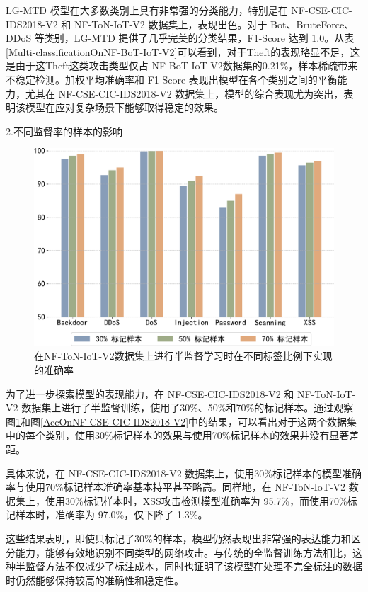 \documentclass[promaster]{thesis-uestc}
\begin{document}
LG-MTD 模型在大多数类别上具有非常强的分类能力，特别是在 NF-CSE-CIC-IDS2018-V2 和 NF-ToN-IoT-V2 数据集上，表现出色。对于 Bot、BruteForce、DDoS 等类别，LG-MTD 提供了几乎完美的分类结果，F1-Score 达到 1.0。从表\ref{Multi-classificationOnNF-BoT-IoT-V2}可以看到，对于Theft的表现略显不足，这是由于这Theft这类攻击类型仅占 NF-BoT-IoT-V2数据集的0.21\%，样本稀疏带来不稳定检测。加权平均准确率和 F1-Score 表现出模型在各个类别之间的平衡能力，尤其在 NF-CSE-CIC-IDS2018-V2 数据集上，模型的综合表现尤为突出，表明该模型在应对复杂场景下能够取得稳定的效果。










2.不同监督率的样本的影响

\begin{figure}[h!]
    \centering
    \includegraphics[width=1\linewidth]{./pic/chart3.pdf}
    \caption{在NF-ToN-IoT-V2数据集上进行半监督学习时在不同标签比例下实现的准确率}
    \label{AccOnNF-ToN-IoT-V2}
\end{figure}
为了进一步探索模型的表现能力，在 NF-CSE-CIC-IDS2018-V2 和 NF-ToN-IoT-V2 数据集上进行了半监督训练，使用了30\%、50\%和70\%的标记样本。通过观察图\ref{AccOnNF-ToN-IoT-V2}和图\ref{AccOnNF-CSE-CIC-IDS2018-V2}中的结果，可以看出对于这两个数据集中的每个类别，使用30\%标记样本的效果与使用70\%标记样本的效果并没有显著差距。

具体来说，在 NF-CSE-CIC-IDS2018-V2 数据集上，使用30\%标记样本的模型准确率与使用70\%标记样本准确率基本持平甚至略高。同样地，在 NF-ToN-IoT-V2 数据集上，使用30\%标记样本时，XSS攻击检测模型准确率为 95.7\%，而使用70\%标记样本时，准确率为 97.0\%，仅下降了 1.3\%。


这些结果表明，即使只标记了30\%的样本，模型仍然表现出非常强的表达能力和区分能力，能够有效地识别不同类型的网络攻击。与传统的全监督训练方法相比，这种半监督方法不仅减少了标注成本，同时也证明了该模型在处理不完全标注的数据时仍然能够保持较高的准确性和稳定性。
\end{document}
